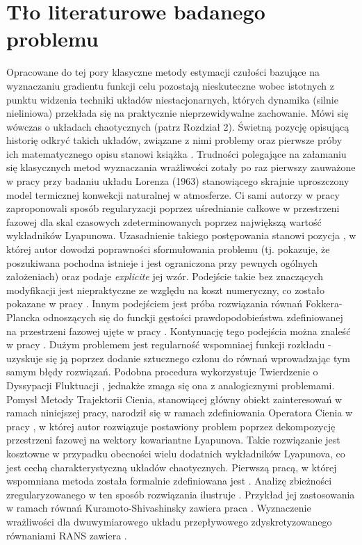 \documentclass[12pt, twoside]{book}
\begin{document}
\section{Tło literaturowe badanego problemu}
Opracowane do tej pory klasyczne metody estymacji czułości bazujące na wyznaczaniu gradientu funkcji celu pozostają nieskuteczne wobec istotnych z punktu widzenia techniki układów niestacjonarnych, których dynamika (silnie nieliniowa) przekłada się na praktycznie nieprzewidywalne zachowanie. Mówi się wówczas o układach chaotycznych (patrz Rozdział 2). Świetną pozycję opisującą historię odkryć takich układów, związane z nimi problemy oraz pierwsze próby ich matematycznego opisu stanowi książka \cite{Gleick}. Trudności polegające na załamaniu się klasycznych metod wyznaczania wrażliwości zotały po raz pierwszy zauważone w pracy \cite{Lea1} przy badaniu układu Lorenza (1963) stanowiącego skrajnie uproszczony model termicznej konwekcji naturalnej w atmosferze. Ci sami autorzy w pracy \cite{Lea2} zaproponowali sposób regularyzacji poprzez uśrednianie całkowe w przestrzeni fazowej dla skal czasowych zdeterminowanych poprzez największą wartość wykładników Lyapunowa. Uzasadnienie takiego postępowania stanowi pozycja \cite{Ruelle1}, w której autor dowodzi poprawności sformułowania problemu (tj. pokazuje, że poszukiwana pochodna istnieje i jest ograniczona przy pewnych ogólnych założeniach) oraz podaje \textit{explicite} jej wzór. Podejście takie bez znaczących modyfikacji jest niepraktyczne ze względu na koszt numeryczny, co zostało pokazane w pracy \cite{Chandramoorthy}.\newline
Innym podejściem jest próba rozwiązania równań Fokkera-Plancka odnoszących się do funckji gęstości prawdopodobieństwa zdefiniowanej na przestrzeni fazowej ujęte w pracy \cite{Thuburn}. Kontynuację tego podejścia można znaleść w pracy \cite{Blonigan1}. Dużym problemem jest regularność wspomniaej funkcji rozkładu - uzyskuje się ją poprzez dodanie sztucznego członu do równań wprowadzając tym samym błędy rozwiązań. Podobna procedura wykorzystuje Twierdzenie o Dyssypacji Fluktuacji \cite{Abramov}, jednakże zmaga się ona z analogicznymi problemami.\newline
Pomysł Metody Trajektorii Cienia, stanowiącej główny obiekt zainteresowań w ramach niniejszej pracy, narodził się w ramach zdefiniowania Operatora Cienia w pracy \cite{Qiqi1}, w której autor rozwiązuje postawiony problem poprzez dekompozycję przestrzeni fazowej na wektory kowariantne Lyapunova. Takie rozwiązanie jest kosztowne w przypadku obecności wielu dodatnich wykładników Lyapunova, co jest cechą charakterystyczną układów chaotycznych. Pierwszą pracą, w której wspomniana metoda została formalnie zdefiniowana jest \cite{Qiqi3}. Analizę zbieżności zregularyzowanego w ten sposób rozwiązania ilustruje \cite{Qiqi2}. Przykład jej zastosowania w ramach równań Kuramoto-Shivashinsky zawiera praca \cite{Blonigan3}. Wyznaczenie wrażliwości dla dwuwymiarowego układu przepływowego zdyskretyzowanego równaniami RANS zawiera \cite{Blonigan2}. \newline
\end{document}
